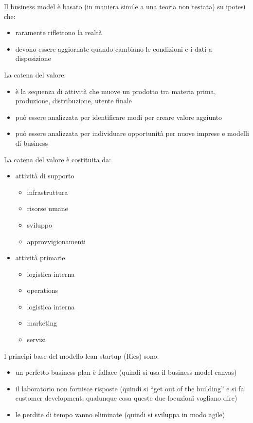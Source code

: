 \documentclass[answers, a4paper, 11pt]{exam}
\begin{document}
Il business model è basato (in maniera simile a una teoria non testata) su ipotesi che:

\begin{itemize}
    \item raramente riflettono la realtà
    \item devono essere aggiornate quando cambiano le condizioni e i dati a disposizione
\end{itemize}

La catena del valore:
\begin{itemize}
    \item è la sequenza di attività che muove un prodotto tra materia prima, produzione, distribuzione, utente finale
    \item può essere analizzata per identificare modi per creare valore aggiunto
    \item può essere analizzata per individuare opportunità per nuove imprese e modelli di business
\end{itemize}

La catena del valore è costituita da:
\begin{itemize}
    \item attività di supporto
    \begin{itemize}
        \item infrastruttura
        \item risorse umane
        \item sviluppo
        \item approvvigionamenti
    \end{itemize}
    \item attività primarie
    \begin{itemize}
        \item logistica interna
        \item operations
        \item logistica interna
        \item marketing
        \item servizi
    \end{itemize}
\end{itemize}

I principi base del modello lean startup (Ries) sono:
\begin{itemize}
    \item un perfetto business plan è fallace (quindi si usa il business model canvas)
    \item il laboratorio non fornisce risposte (quindi si ``get out of the building'' e si fa customer development, qualunque cosa queste due locuzioni vogliano dire)
    \item le perdite di tempo vanno eliminate (quindi si sviluppa in modo agile)
\end{itemize}
\end{document}
